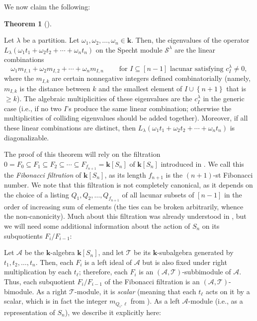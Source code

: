 \documentclass[numbers=enddot,12pt,final,onecolumn,notitlepage]{scrartcl}%
\theoremstyle{definition}
\newtheorem{theo}{Theorem}[section]
\newenvironment{theorem}[1][]
{\begin{theo}[#1]\begin{leftbar}}
{\end{leftbar}\end{theo}}
\begin{document}
We now claim the following:

\begin{theorem}
[part of Theorem \ref{thm.eigs}]\label{thm.intro.eigs}Let $\lambda$ be a
partition. Let $\omega_{1},\omega_{2},\ldots,\omega_{n}\in\mathbf{k}$. Then,
the eigenvalues of the operator $L_{\lambda}\left(  \omega_{1}t_{1}+\omega
_{2}t_{2}+\cdots+\omega_{n}t_{n}\right)  $ on the Specht module $\mathcal{S}%
^{\lambda}$ are the linear combinations%
\[
\omega_{1}m_{I,1}+\omega_{2}m_{I,2}+\cdots+\omega_{n}m_{I,n}%
\ \ \ \ \ \ \ \ \ \ \text{for }I\subseteq\left[  n-1\right]  \text{ lacunar
satisfying }c_{I}^{\lambda}\neq0,
\]
where the $m_{I,k}$ are certain nonnegative integers defined combinatorially
(namely, $m_{I,k}$ is the distance between $k$ and the smallest element of
$I\cup\left\{  n+1\right\}  $ that is $\geq k$). The algebraic multiplicities
of these eigenvalues are the $c_{I}^{\lambda}$ in the generic case (i.e., if
no two $I$'s produce the same linear combination; otherwise the multiplicities
of colliding eigenvalues should be added together). Moreover, if all these
linear combinations are distinct, then $L_{\lambda}\left(  \omega_{1}%
t_{1}+\omega_{2}t_{2}+\cdots+\omega_{n}t_{n}\right)  $ is diagonalizable.
\end{theorem}

The proof of this theorem will rely on the filtration $0=F_{0}\subseteq
F_{1}\subseteq F_{2}\subseteq\cdots\subseteq F_{f_{n+1}}=\mathbf{k}\left[
S_{n}\right]  $ of $\mathbf{k}\left[  S_{n}\right]  $ introduced in
\cite[\S 8.1]{s2b1}. We call this the \emph{Fibonacci filtration} of
$\mathbf{k}\left[  S_{n}\right]  $, as its length $f_{n+1}$ is the $\left(
n+1\right)  $-st Fibonacci number. We note that this filtration is not
completely canonical, as it depends on the choice of a listing $Q_{1}%
,Q_{2},\ldots,Q_{f_{n+1}}$ of all lacunar subsets of $\left[  n-1\right]  $ in
the order of increasing sum of elements (the ties can be broken arbitrarily,
whence the non-canonicity). Much about this filtration was already understood
in \cite{s2b1}, but we will need some additional information about the action
of $S_{n}$ on its subquotients $F_{i}/F_{i-1}$:

Let $\mathcal{A}$ be the $\mathbf{k}$-algebra $\mathbf{k}\left[  S_{n}\right]
$, and let $\mathcal{T}$ be its $\mathbf{k}$-subalgebra generated by
$t_{1},t_{2},\ldots,t_{n}$. Then, each $F_{i}$ is a left ideal of
$\mathcal{A}$ but is also fixed under right multiplication by each $t_{\ell}$;
therefore, each $F_{i}$ is an $\left(  \mathcal{A},\mathcal{T}\right)
$-subbimodule of $\mathcal{A}$. Thus, each subquotient $F_{i}/F_{i-1}$ of the
Fibonacci filtration is an $\left(  \mathcal{A},\mathcal{T}\right)
$-bimodule. As a right $\mathcal{T}$-module, it is \emph{scalar} (meaning that
each $t_{\ell}$ acts on it by a scalar, which is in fact the integer
$m_{Q_{i},\ell}$ from \cite[Theorem 8.1 \textbf{(c)}]{s2b1}). As a left
$\mathcal{A}$-module (i.e., as a representation of $S_{n}$), we describe it
explicitly here:
\end{document}
